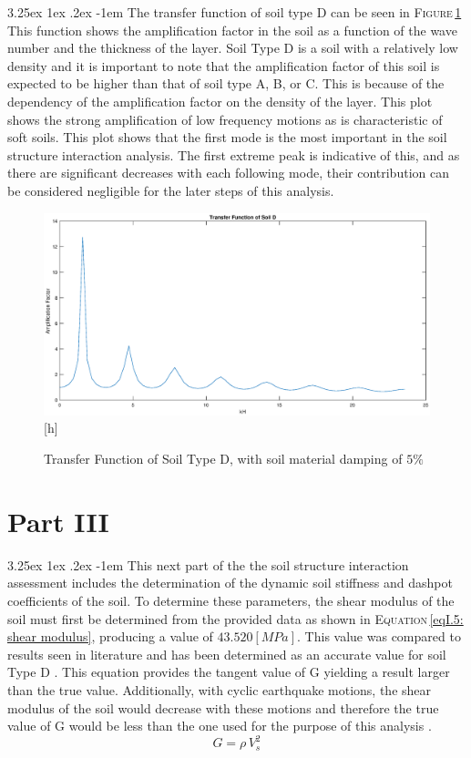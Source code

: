 \documentclass[11pt,a4paper,titlepage]{report}
\makeatletter
\renewcommand\paragraph{\@startsection{paragraph}{5}{\z@}%
  {3.25ex \@plus1ex \@minus.2ex}%
  {-1em}%
  {\normalfont\normalsize\bfseries}}
\makeatother
\begin{document}
\paragraph{}The transfer function of soil type D can be seen in  \textsc{Figure}\,\ref{fig:I.5 - Transfer Function} This function shows the amplification factor in the soil as a function of the wave number and the thickness of the layer. Soil Type D is a soil with a relatively low density and it is important to note that the amplification factor of this soil is expected to be higher than that of soil type A, B, or C. This is because of the dependency of the amplification factor on the density of the layer. This plot shows the strong amplification of low frequency motions as is characteristic of soft soils. This plot shows that the first mode is the most important in the soil structure interaction analysis. The first extreme peak is indicative of this, and as there are significant decreases with each following mode, their contribution can be considered negligible for the later steps of this analysis.
\begin{figure}
    \centering
    \includegraphics[width=14cm]{Transfer_Function.eps}[h]
    \caption{Transfer Function of Soil Type D, with soil material damping of $5\%$}
    \label{fig:I.5 - Transfer Function}
\end{figure}
\section{Part III}
\paragraph{}This next part of the the soil structure interaction assessment includes the determination of the dynamic soil stiffness and dashpot coefficients of the soil. To determine these parameters, the shear modulus of the soil must first be determined from the provided data as shown in \textsc{Equation}\,\eqref{eqI.5: shear modulus}, producing a value of $43.520 [MPa]$. This value was compared to results seen in literature and has been determined as an accurate value for soil Type D \cite{Shear}. This equation provides the tangent value of G yielding a result larger than the true value. Additionally, with cyclic earthquake motions, the shear modulus of the soil would decrease with these motions and therefore the true value of G would be less than the one used for the purpose of this analysis \cite{Soil}.
\begin{equation}
    G=\rho\,V_s^2
    \label{eqI.5: shear modulus}
\end{equation}
\end{document}
